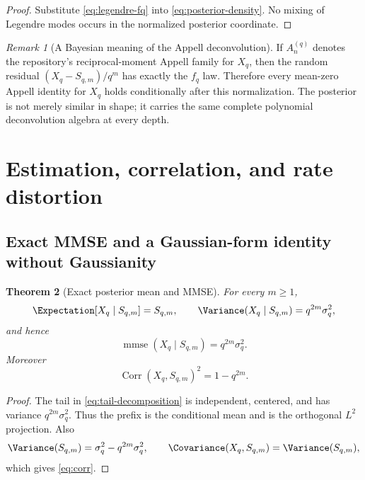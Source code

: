 \documentclass[11pt,oneside]{article}
\newtheorem{theorem}{Theorem}[section]
\theoremstyle{definition}
\theoremstyle{remark}
\newtheorem{remark}[theorem]{Remark}
\newcommand{\Corr}{\operatorname{Corr}}
\newcommand{\mmse}{\operatorname{mmse}}
\begin{document}
\begin{proof}
Substitute \eqref{eq:legendre-fq} into \eqref{eq:posterior-density}.  No mixing of
Legendre modes occurs in the normalized posterior coordinate.
\end{proof}

\begin{remark}[A Bayesian meaning of the Appell deconvolution]
If $A_n^{(q)}$ denotes the repository's reciprocal-moment Appell family for
$X_q$, then the random residual $(X_q-S_{q,m})/q^m$ has exactly the $f_q$ law.
Therefore every mean-zero Appell identity for $X_q$ holds conditionally after this
normalization.  The posterior is not merely similar in shape; it carries the same
complete polynomial deconvolution algebra at every depth.
\end{remark}

\section{Estimation, correlation, and rate distortion}
\label{sec:estimation}

\subsection{Exact MMSE and a Gaussian-form identity without Gaussianity}

\begin{theorem}[Exact posterior mean and MMSE]
\label{thm:mmse}
For every $m\ge1$,
\begin{equation}
 \Expectation[X_q\mid S_{q,m}]=S_{q,m},
 \qquad
 \Variance(X_q\mid S_{q,m})=q^{2m}\sigma_q^2,
 \label{eq:conditional-mean-var}
\end{equation}
and hence
\begin{equation}
 \boxed{\mmse(X_q\mid S_{q,m})=q^{2m}\sigma_q^2.}
 \label{eq:mmse}
\end{equation}
Moreover
\begin{equation}
 \Corr(X_q,S_{q,m})^2=1-q^{2m}.
 \label{eq:corr}
\end{equation}
\end{theorem}

\begin{proof}
The tail in \eqref{eq:tail-decomposition} is independent, centered, and has
variance $q^{2m}\sigma_q^2$.  Thus the prefix is the conditional mean and is the
orthogonal $L^2$ projection.  Also
\[
 \Variance(S_{q,m})=\sigma_q^2-q^{2m}\sigma_q^2,
 \qquad
 \Covariance(X_q,S_{q,m})=\Variance(S_{q,m}),
\]
which gives \eqref{eq:corr}.
\end{proof}
\end{document}
